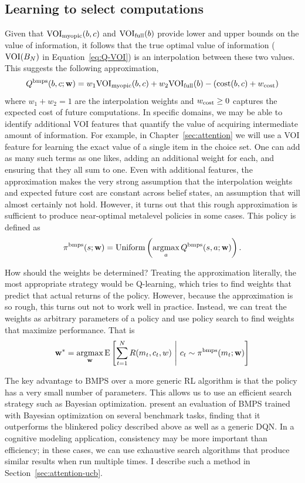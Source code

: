 \subsection{Learning to select computations}

Given that $\text{VOI}_\text{myopic}(b,c)$ and $\text{VOI}_\text{full}(b)$ provide lower and upper bounds on the value of information, it follows that the true optimal value of information ($\text{VOI}(B_N)$ in Equation~\ref{eq:Q-VOI}) is an interpolation between these two values. This suggests the following approximation,
\begin{equation}\label{eq:bmpsQ}
  Q^{\mathrm{bmps}}(b, c; \mathbf{w}) = w_1 \text{VOI}_\text{myopic}(b,c) + w_2 \text{VOI}_\text{full}(b) - (\text{cost}(b, c) + w_{\text{cost}})
\end{equation}
where $w_1 + w_2 = 1$ are the interpolation weights and $w_{\text{cost}} \geq 0$ captures the expected cost of future computations. In specific domains, we may be able to identify additional VOI features that quantify the value of acquiring intermediate amount of information. For example, in Chapter~\ref{sec:attention} we will use a VOI feature for learning the exact value of a single item in the choice set. One can add as many such terms as one likes, adding an additional weight for each, and ensuring that they all sum to one. Even with additional features, the approximation makes the very strong assumption that the interpolation weights and expected future cost are constant across belief states, an assumption that will almost certainly not hold. However, it turns out that this rough approximation is sufficient to produce near-optimal metalevel policies in some cases. This policy is defined as
\begin{equation}
  \pi^{\mathrm{bmps}}(s; \mathbf{w}) = \mathrm{Uniform}\left(\operatorname*{argmax}_a Q^{\mathrm{bmps}}(s, a; \mathbf{w})\right).
\end{equation}

How should the weights be determined? Treating the approximation literally, the most appropriate strategy would be Q-learning, which tries to find weights that predict that actual returns of the policy. However, because the approximation is so rough, this turns out not to work well in practice. Instead, we can treat the weights as arbitrary parameters of a policy and use policy search to find weights that maximize performance. That is
\begin{equation}
  \mathbf{w}^* = \operatorname*{argmax}_{\mathbf{w}} \operatorname*{E} \left[ 
    \sum_{t=1}^{N} R(m_t, c_t, w)
   \ \middle\vert\ 
    c_t \sim \pi^{\mathrm{bmps}}(m_t; \mathbf{w})
   \right]
\end{equation}

The key advantage to BMPS over a more generic RL algorithm is that the policy has a very small number of parameters. This allows us to use an efficient search strategy such as Bayesian optimization. \citet{callaway2018learning} present an evaluation of BMPS trained with Bayesian optimization on several benchmark tasks, finding that it outperforms the blinkered policy described above as well as a generic DQN. In a cognitive modeling application, consistency may be more important than efficiency; in these cases, we can use exhaustive search algorithms that produce similar results when run multiple times. I describe such a method in Section~\ref{sec:attention-ucb}.

